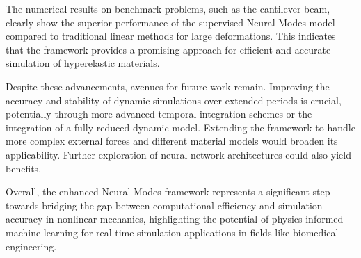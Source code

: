 \documentclass[11pt,a4paper,twocolumn]{article}
\begin{document}
The numerical results on benchmark problems, such as the cantilever beam, clearly show the superior performance of the supervised Neural Modes model compared to traditional linear methods for large deformations. This indicates that the framework provides a promising approach for efficient and accurate simulation of hyperelastic materials.

Despite these advancements, avenues for future work remain. Improving the accuracy and stability of dynamic simulations over extended periods is crucial, potentially through more advanced temporal integration schemes or the integration of a fully reduced dynamic model. Extending the framework to handle more complex external forces and different material models would broaden its applicability. Further exploration of neural network architectures could also yield benefits.

Overall, the enhanced Neural Modes framework represents a significant step towards bridging the gap between computational efficiency and simulation accuracy in nonlinear mechanics, highlighting the potential of physics-informed machine learning for real-time simulation applications in fields like biomedical engineering.


\end{document}
